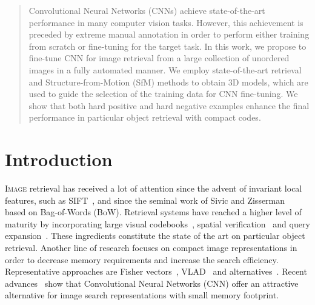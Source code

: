 \documentclass[runningheads]{llncs}
\begin{document}
\newcommand{\alert}[1]{{\color{red}{#1}}}
\newcommand{\todo}[1]{{\color{blue}{#1}}}

\renewcommand{\b}[1]{\textbf{#1}}
\newcommand{\w}[1]{\color{blue}{#1}}
\newcommand{\ww}[1]{\textbf{\color{blue}{#1}}}

\newcommand{\nb}[1]{\textbf{\color{darkred}{#1}}}
\renewcommand{\sb}[1]{{\color{black}{\contour{darkred}{#1}}}}
\newcommand{\ob}[1]{\textbf{#1}}
\newcommand{\bo}{\cellcolor{gray!15}}

\def\sssp{\hspace{1pt}}
\def\ssp{\hspace{3pt}}
\def\msp{\hspace{5pt}}
\def\bsp{\hspace{8pt}}
 
\begin{abstract}
Convolutional Neural Networks (CNNs) achieve state-of-the-art performance in many computer vision tasks. However, this achievement is preceded by extreme manual annotation in order to perform either training from scratch or fine-tuning for the target task. In this work, we propose to fine-tune CNN for image retrieval from a large collection of unordered images in a fully automated manner.
We employ state-of-the-art retrieval and Structure-from-Motion (SfM) methods to obtain 3D models, which are used to guide the selection of the training data for CNN fine-tuning. We show that both hard positive and hard negative examples enhance the final performance in particular object retrieval with compact codes.
\end{abstract}

\section{Introduction}
\lettrine{I}{mage} retrieval has received a lot of attention since the advent of invariant local features, such as SIFT~\cite{L04}, and since the seminal work of Sivic and Zisserman~\cite{SZ03} based on Bag-of-Words (BoW). 
Retrieval systems have reached a higher level of maturity by incorporating large visual codebooks~\cite{PCISZ07,AK12}, spatial verification~\cite{PCISZ07,SLBW14} and query expansion~\cite{CMPM11,DGBQG11,TJ14}. 
These ingredients constitute the state of the art on particular object retrieval.
Another line of research focuses on compact image representations in order to decrease memory requirements and increase the search efficiency. 
Representative approaches are Fisher vectors~\cite{PLSP10}, VLAD~\cite{JPDSPS11} and alternatives~\cite{RJC15,AZ13,TFJ14}.
Recent advances~\cite{BSCL14,RSMC14} show that Convolutional Neural Networks (CNN) offer an attractive alternative for image search representations with small memory footprint.
\end{document}
